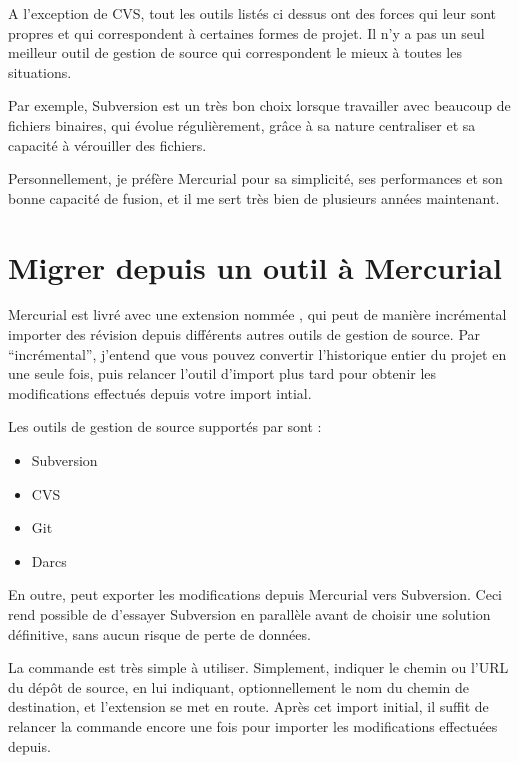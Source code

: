 A l'exception de CVS, tout les outils listés ci dessus ont des 
forces qui leur sont propres et qui correspondent à certaines
formes de projet. Il n'y a pas un seul meilleur outil de gestion
de source qui correspondent le mieux à toutes les situations.

Par exemple, Subversion est un très bon choix lorsque travailler
avec beaucoup de fichiers binaires, qui évolue régulièrement, grâce
à sa nature centraliser et sa capacité à vérouiller des fichiers.

Personnellement, je préfère Mercurial pour sa simplicité, ses 
performances et son bonne capacité de fusion, et il me sert très bien
de plusieurs années maintenant.

\section{Migrer depuis un outil à Mercurial}

Mercurial est livré avec une extension nommée , qui
peut de manière incrémental importer des révision depuis différents
autres outils de gestion de source. Par ``incrémental'', j'entend que
vous pouvez convertir l'historique entier du projet en une seule fois,
puis relancer l'outil d'import plus tard pour obtenir les modifications
effectués depuis votre import intial.

Les outils de gestion de source supportés par  sont :
\begin{itemize}
	\item Subversion
	\item CVS
	\item Git
	\item Darcs
\end{itemize}

En outre,  peut exporter les modifications depuis Mercurial
vers Subversion. Ceci rend possible de d'essayer Subversion en parallèle 
avant de choisir une solution définitive, sans aucun risque de perte de
données.


La commande  est très simple à utiliser. Simplement,
indiquer le chemin ou l'URL du dépôt de source, en lui indiquant, optionnellement
le nom du chemin de destination, et l'extension se met en route. Après cet
import initial, il suffit de relancer la commande encore une fois pour 
importer les modifications effectuées depuis.

